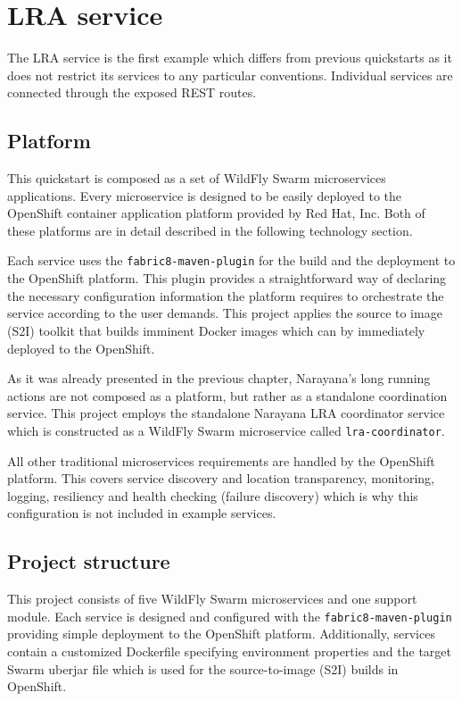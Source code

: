 \documentclass[oneside,
  digital, %
  table,   %
  nolof,     %
  nolot,     %
]{fithesis3}
\begin{document}
\section{LRA service}

The LRA service is the first example which differs from previous quickstarts as it does not restrict its services to any particular conventions. Individual services are connected through the exposed REST routes.

\subsection{Platform}

This quickstart is composed as a set of WildFly Swarm microservices applications. Every microservice is designed to be easily deployed to the OpenShift container application platform provided by Red Hat, Inc. \cite{openshift} Both of these platforms are in detail described in the following technology section.

Each service uses the \texttt{fabric8-maven-plugin} for the build and the deployment to the OpenShift platform. This plugin provides a straightforward way of declaring the necessary configuration information the platform requires to orchestrate the service according to the user demands. This project applies the source to image (S2I) toolkit that builds imminent Docker images which can by immediately deployed to the OpenShift. 

As it was already presented in the previous chapter, Narayana's long running actions are not composed as a platform, but rather as a standalone coordination service. This project employs the standalone Narayana LRA coordinator service which is constructed as a WildFly Swarm microservice called \texttt{lra-coordinator}. 

All other traditional microservices requirements are handled by the OpenShift platform. This covers service discovery and location transparency, monitoring, logging, resiliency and health checking (failure discovery) which is why this configuration is not included in example services.


\subsection{Project structure}

This project consists of five WildFly Swarm microservices and one support module. Each service is designed and configured with the \texttt{fabric8-maven-plugin} providing simple deployment to the OpenShift platform. Additionally, services contain a customized Dockerfile specifying environment properties and the target Swarm uberjar file which is used for the source-to-image (S2I) builds in OpenShift.
\end{document}
